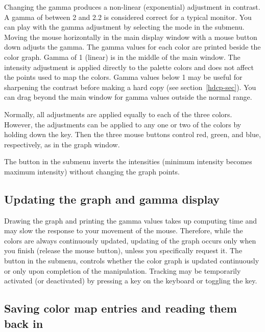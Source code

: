 Changing the gamma produces a non-linear (exponential) adjustment in
contrast.  A gamma of between 2 and 2.2 is considered correct for a
typical monitor.  You can play with the gamma adjustment by selecting
the  mode in the  submenu.  Moving the mouse horizontally
in the main display window with a mouse button down adjusts the gamma.
The gamma values for each color are printed beside the color graph.
Gamma of 1 (linear) is in the middle of the main window.  The intensity
adjustment is applied directly to the palette colors and does not affect
the points used to map the colors.  Gamma values below 1 may be useful
for sharpening the contrast before making a hard copy
(see section~\ref{hdcp-sec}).  You can drag
beyond the main window for gamma values outside the normal range.

Normally, all adjustments are applied equally to each of the three colors.
However, the adjustments can be applied to any one or two of the colors
by holding down the  key.  Then the three mouse buttons control
red, green, and blue, respectively, as in the graph window.

The  button in the  submenu inverts the intensities
(minimum intensity becomes maximum intensity) without changing the graph
points.

\subsection{ Updating the graph and gamma display }

Drawing the graph and printing the gamma values takes up computing time
and may slow the response to your movement of the mouse.  Therefore,
while the colors are always continuously updated, updating of the graph
occurs only when you finish (release the mouse button), unless you
specifically request it.  The  button in the  submenu,
controls whether the color graph is updated continuously or only upon
completion of the manipulation.  Tracking may be temporarily activated
(or deactivated) by pressing a  key on the keyboard or toggling
the  key.

\subsection{ Saving color map entries and reading them back in }

